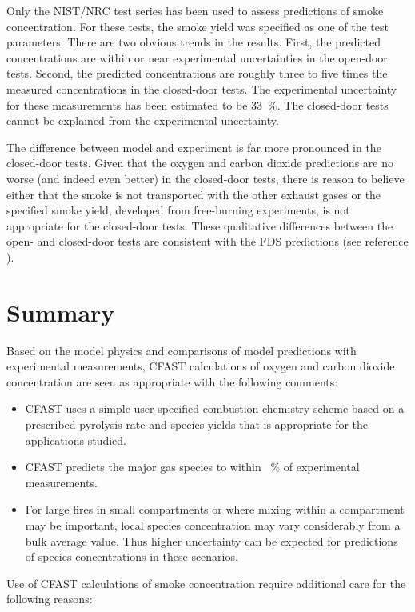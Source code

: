 Only the NIST/NRC test series has been used to assess predictions of smoke concentration.  For these tests, the smoke yield was specified as one of the test parameters.  There are two obvious trends in the results.  First, the predicted concentrations are within or near experimental uncertainties in the open-door tests.  Second, the predicted concentrations are roughly three to five times the measured concentrations in the closed-door tests.  The experimental uncertainty for these measurements has been estimated to be 33~\%.  The closed-door tests cannot be explained from the experimental uncertainty.

The difference between model and experiment is far more pronounced in the closed-door tests.  Given that the oxygen and carbon dioxide predictions are no worse (and indeed even better) in the closed-door tests, there is reason to believe either that the smoke is not transported with the other exhaust gases or the specified smoke yield, developed from free-burning experiments, is not appropriate for the closed-door tests.  These qualitative differences between the open- and closed-door tests are consistent with the FDS predictions (see reference \cite{NRCNUREG1824_FDS}).

\section{Summary}

Based on the model physics and comparisons of model predictions with experimental measurements, CFAST calculations of oxygen and carbon dioxide concentration are seen as appropriate with the following comments:

\begin{itemize}
\item CFAST uses a simple user-specified combustion chemistry scheme based on a prescribed pyrolysis rate and species yields that is appropriate for the applications studied.
\item CFAST predicts the major gas species to within \Speciesavg ~\% of experimental measurements.
\item For large fires in small compartments or where mixing within a compartment may be important, local species concentration may vary considerably from a bulk average value.  Thus higher uncertainty can be expected for predictions of species concentrations in these scenarios.
\end{itemize}

Use of CFAST calculations of smoke concentration require additional care for the following reasons:

